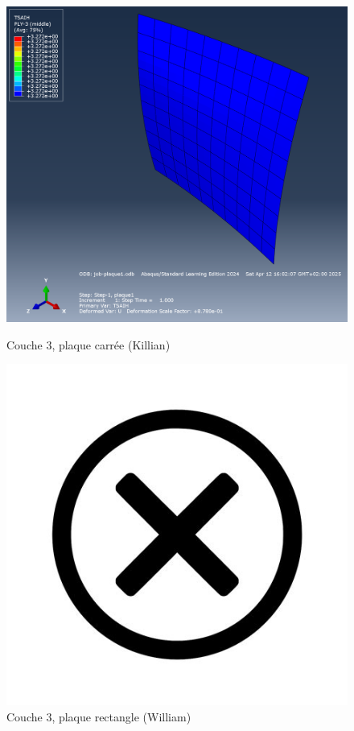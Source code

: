 \documentclass[a4paper,12pt]{article}
\begin{document}
\begin{figure}[h!]
	\centering
	\begin{minipage}{0.495\textwidth}
		\centering
		\includegraphics[width=\textwidth]{media/K_P1_L3_12042025.png} %
		\caption{Couche 3, plaque carrée (Killian)}
		\label{fig:image1}
	\end{minipage}
	\hfill
	\begin{minipage}{0.495\textwidth}
		\centering
		\includegraphics[width=\textwidth]{media/no-image.jpg} %
		\caption{Couche 3, plaque rectangle (William)}
		\label{fig:image2}
	\end{minipage}
\end{figure}
\end{document}
